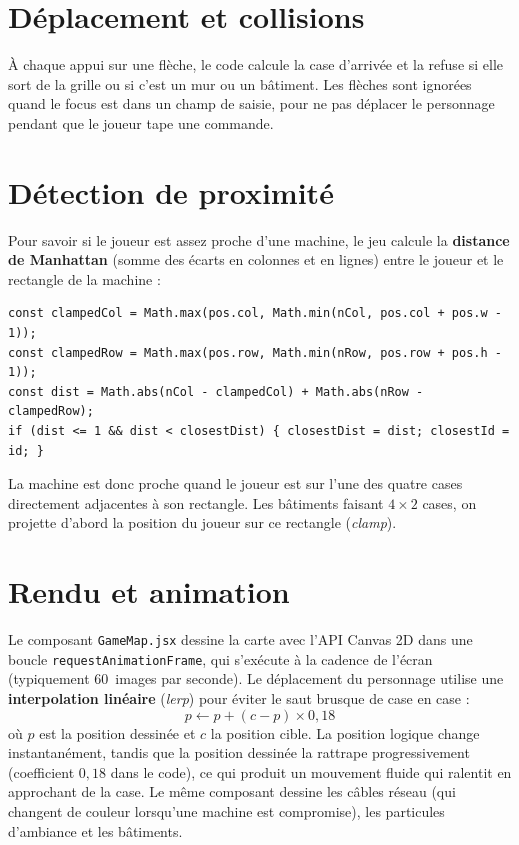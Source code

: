 \documentclass[11pt,a4paper]{report}
\newcommand{\file}[1]{\texttt{\nolinkurl{#1}}}
\begin{document}
\section{D\'eplacement et collisions}

\`A chaque appui sur une fl\`eche, le code calcule la case d'arriv\'ee et la refuse si elle
sort de la grille ou si c'est un mur ou un b\^atiment. Les fl\`eches sont ignor\'ees quand le
focus est dans un champ de saisie, pour ne pas d\'eplacer le personnage pendant que le
joueur tape une commande.

\section{D\'etection de proximit\'e}

Pour savoir si le joueur est assez proche d'une machine, le jeu calcule la
\textbf{distance de Manhattan} (somme des \'ecarts en colonnes et en lignes) entre le
joueur et le rectangle de la machine :

\begin{lstlisting}[style=js,caption={Proximit\'e d'une machine (\file{App.jsx})}]
const clampedCol = Math.max(pos.col, Math.min(nCol, pos.col + pos.w - 1));
const clampedRow = Math.max(pos.row, Math.min(nRow, pos.row + pos.h - 1));
const dist = Math.abs(nCol - clampedCol) + Math.abs(nRow - clampedRow);
if (dist <= 1 && dist < closestDist) { closestDist = dist; closestId = id; }
\end{lstlisting}

La machine est donc proche quand le joueur est sur l'une des quatre cases directement
adjacentes \`a son rectangle. Les b\^atiments faisant $4 \times 2$ cases, on projette
d'abord la position du joueur sur ce rectangle (\emph{clamp}).

\section{Rendu et animation}

Le composant \file{GameMap.jsx} dessine la carte avec l'API Canvas 2D dans une boucle
\texttt{requestAnimationFrame}, qui s'ex\'ecute \`a la cadence de l'\'ecran (typiquement
60~images par seconde). Le d\'eplacement du personnage utilise une
\textbf{interpolation lin\'eaire} (\emph{lerp}) pour \'eviter le saut brusque de case en
case :
\[
  p \leftarrow p + (c - p) \times 0{,}18
\]
o\`u $p$ est la position dessin\'ee et $c$ la position cible. La position logique change
instantan\'ement, tandis que la position dessin\'ee la
rattrape progressivement (coefficient $0{,}18$ dans le code), ce qui produit un
mouvement fluide qui ralentit en approchant de la case. Le m\^eme composant dessine les
c\^ables r\'eseau (qui changent de couleur lorsqu'une machine est compromise), les
particules d'ambiance et les b\^atiments.
\end{document}
